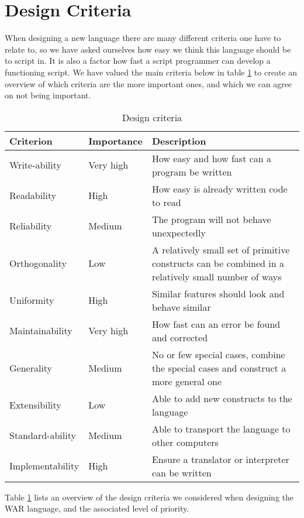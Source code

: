 
\section{Design Criteria}
\label{chap:DesCrit}
When designing a new language there are many different criteria one have to relate to, so we have asked ourselves how easy we think this language should be to script in. It is also a factor how fast a script programmer can develop a functioning script. We have valued the main criteria below in table \ref{tab:criteria_tabular} to create an overview of which criteria are the more important ones, and which we can agree on not being important.   

\begin{table}[H]
	\begin{tabular}{| 	l	|	 l	| p{7cm}	|}
	\hline
	Criterion			&	Importance	&		Description	\\	
	\hline
	Write-ability 		& 	Very high	&		How easy and how fast can a program be written\\
	Readability			& 	High		&		How easy is already written code to read\\
	Reliability			& 	Medium		&		The program will not behave unexpectedly\\
	Orthogonality		& 	Low			&		A relatively small set of primitive constructs can be combined in a relatively small number of ways\\
	Uniformity			& 	High		&		Similar features should look and behave similar\\
	Maintainability		& 	Very high	&		How fast can an error be found and corrected\\
	Generality			& 	Medium		&		No or few special cases, combine the special cases and construct a more general one\\
	Extensibility		& 	Low			&		Able to add new constructs to the language\\
	Standard-ability		& 	Medium		&		Able to transport the language to other computers\\
	Implementability	& 	High			&		Ensure a translator or interpreter can be written\\
	\hline
	\end{tabular}
	\caption{Design criteria \cite{criteria}}
	\label{tab:criteria_tabular}
\end{table}


Table \ref{tab:criteria_tabular} lists an overview of the design criteria we considered when designing the WAR language, and the associated level of priority.

